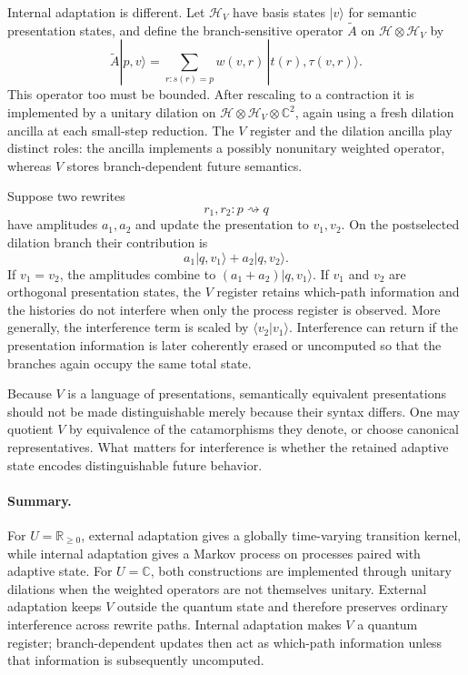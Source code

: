 \documentclass[10pt]{article}
\newcommand{\C}{\mathbb{C}}
\newcommand{\Rnn}{\mathbb{R}_{\ge 0}}
\newcommand{\Hh}{\mathcal{H}}
\newcommand{\Hv}{\mathcal{H}_V}
\begin{document}
Internal adaptation is different.  Let $\Hv$ have basis states $|v\rangle$
for semantic presentation states, and define the branch-sensitive operator
$\widetilde A$ on $\Hh\otimes\Hv$ by
\[
\widetilde A|p,v\rangle
=
\sum_{r:s(r)=p}
w(v,r)\,|t(r),\tau(v,r)\rangle.
\]
This operator too must be bounded.  After rescaling to a contraction it is
implemented by a unitary dilation on
$\Hh\otimes\Hv\otimes\C^2$, again using a fresh dilation ancilla at each
small-step reduction.  The $V$ register and the dilation ancilla play distinct
roles: the ancilla implements a possibly nonunitary weighted operator, whereas
$V$ stores branch-dependent future semantics.

Suppose two rewrites
\[
r_1,r_2:p\rightsquigarrow q
\]
have amplitudes $a_1,a_2$ and update the presentation to $v_1,v_2$.  On the
postselected dilation branch their contribution is
\[
a_1|q,v_1\rangle+a_2|q,v_2\rangle.
\]
If $v_1=v_2$, the amplitudes combine to $(a_1+a_2)|q,v_1\rangle$.  If $v_1$
and $v_2$ are orthogonal presentation states, the $V$ register retains
which-path information and the histories do not interfere when only the
process register is observed.  More generally, the interference term is
scaled by $\langle v_2|v_1\rangle$.  Interference can return if the presentation
information is later coherently erased or uncomputed so that the branches
again occupy the same total state.

Because $V$ is a language of presentations, semantically equivalent
presentations should not be made distinguishable merely because their syntax
differs.  One may quotient $V$ by equivalence of the catamorphisms they denote,
or choose canonical representatives.  What matters for interference is
whether the retained adaptive state encodes distinguishable future behavior.

\paragraph{Summary.}
For $U=\Rnn$, external adaptation gives a globally time-varying transition
kernel, while internal adaptation gives a Markov process on processes paired
with adaptive state.  For $U=\C$, both constructions are implemented through
unitary dilations when the weighted operators are not themselves unitary.
External adaptation keeps $V$ outside the quantum state and therefore preserves
ordinary interference across rewrite paths.  Internal adaptation makes $V$ a
quantum register; branch-dependent updates then act as which-path information
unless that information is subsequently uncomputed.
\end{document}
